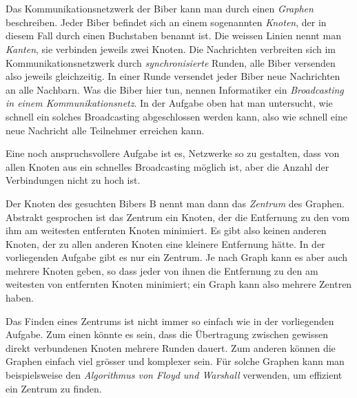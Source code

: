 {{\section*{\BrochureItsInformatics}
Das Kommunikationsnetzwerk der Biber kann man durch einen \emph{Graphen} beschreiben. Jeder Biber befindet sich an einem sogenannten \emph{Knoten}, der in diesem Fall durch einen Buchstaben benannt ist. Die weissen Linien nennt man \emph{Kanten}, sie verbinden jeweils zwei Knoten. Die Nachrichten verbreiten sich im Kommunikationsnetzwerk durch \emph{synchronisierte} Runden, alle Biber versenden also jeweils gleichzeitig. In einer Runde versendet jeder Biber neue Nachrichten an alle Nachbarn. Was die Biber hier tun, nennen Informatiker ein \emph{Broadcasting in einem Kommunikationsnetz}. In der Aufgabe oben hat man untersucht, wie schnell ein solches Broadcasting abgeschlossen werden kann, also wie schnell eine neue Nachricht alle Teilnehmer erreichen kann.

Eine noch anspruchsvollere Aufgabe ist es, Netzwerke so zu gestalten, dass von allen Knoten aus ein schnelles Broadcasting möglich ist, aber die Anzahl der Verbindungen nicht zu hoch ist.

Der Knoten des gesuchten Bibers B nennt man dann das \emph{Zentrum} des Graphen. Abstrakt gesprochen ist das Zentrum ein Knoten, der die Entfernung zu den vom ihm am weitesten entfernten Knoten minimiert. Es gibt also keinen anderen Knoten, der zu allen anderen Knoten eine kleinere Entfernung hätte. In der vorliegenden Aufgabe gibt es nur ein Zentrum. Je nach Graph kann es aber auch mehrere Knoten geben, so dass jeder von ihnen die Entfernung zu den am weitesten von entfernten Knoten minimiert; ein Graph kann also mehrere Zentren haben.

Das Finden eines Zentrums ist nicht immer so einfach wie in der vorliegenden Aufgabe. Zum einen könnte es sein, dass die Übertragung zwischen gewissen direkt verbundenen Knoten mehrere Runden dauert. Zum anderen können die Graphen einfach viel grösser und komplexer sein. Für solche Graphen kann man beispielsweise den \emph{Algorithmus von Floyd und Warshall} verwenden, um effizient ein Zentrum zu finden.



}}
